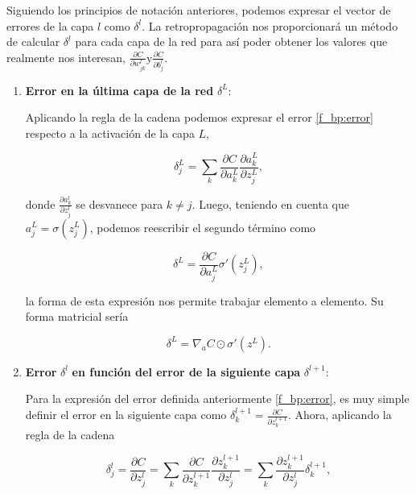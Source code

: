 \begin{appendices}
Siguiendo los principios de notación anteriores, podemos expresar el vector de errores de la capa $l$ como $\delta^l$. La retropropagación nos proporcionará un método de calcular $\delta^l$ para cada capa de la red para así poder obtener los valores que realmente nos interesan, $\frac{\partial C}{\partial w_{jk}^l} \text{y} \frac{\partial C}{\partial b_j^l}$.

\begin{enumerate}
	\item \textbf{Error en la última capa de la red} $\delta^L$:

	Aplicando la regla de la cadena podemos expresar el error \eqref{f_bp:error} respecto a la activación de la capa $L$,

	\begin{equation}
		\delta_j^L = \sum_k \frac{\partial C}{\partial a_k^L} \frac{\partial a_k^L}{\partial z_j^L},
	\end{equation}

	donde $\frac{\partial a_k^l}{\partial z_j^l}$ se desvanece para $k \neq j$. Luego, teniendo en cuenta que $a_j^L = \sigma(z_j^L)$, podemos reescribir el segundo término como

	\begin{equation}\label{f_bp:error_ultima_capa}
		\delta^L = \frac{\partial C}{\partial a_j^L}\sigma'(z_j^L),
	\end{equation}

	la forma de esta expresión nos permite trabajar elemento a elemento. Su forma matricial sería

	\begin{equation}\label{f_bp:error_ultima_capa_mat}
		\delta^L = \nabla_a C \odot \sigma'(z^L).
	\end{equation}

	\item \textbf{Error} $\delta^l$ \textbf{en función del error de la siguiente capa} $\delta^{l+1}$:

	Para la expresión del error definida anteriormente \eqref{f_bp:error}, es muy simple definir el error en la siguiente capa como $\delta_k^{l+1} = \frac{\partial C}{\partial z_k^{l+1}}$. Ahora, aplicando la regla de la cadena

	\begin{equation}
		\delta_j^l = \frac{\partial C}{\partial z_j^l} = \sum_k \frac{\partial C}{\partial z_k^{l+1}} \frac{\partial z_k^{l+1}}{\partial z_j^l} = \sum_k \frac{\partial z_k^{l+1}}{\partial z_j^l}\delta_k^{l+1},
	\end{equation}


\end{enumerate}
\end{appendices}
